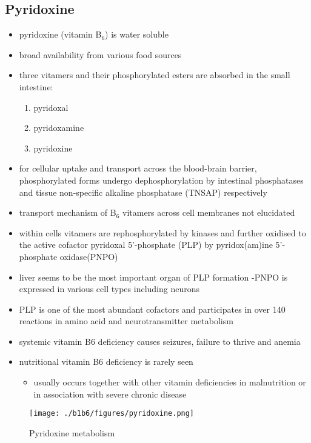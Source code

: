 \documentclass{scrartcl}
\begin{document}
\subsection{Pyridoxine}
\label{sec:org0349fe6}
\begin{itemize}
\item pyridoxine (vitamin B\(_{\text{6}}\)) is water soluble
\item broad availability from various food sources
\item three vitamers and their phosphorylated esters are absorbed in the
small intestine:
\begin{enumerate}
\item pyridoxal
\item pyridoxamine
\item pyridoxine
\end{enumerate}

\item for cellular uptake and transport across the blood-brain barrier,
phosphorylated forms undergo dephosphorylation by intestinal
phosphatases and tissue non-specific alkaline phosphatase (TNSAP)
respectively
\item transport mechanism of B\(_{\text{6}}\) vitamers across cell membranes not elucidated
\item within cells vitamers are rephosphorylated by kinases and further oxidised to the
active cofactor pyridoxal 5’-phosphate (PLP) by pyridox(am)ine
5’-phosphate oxidase(PNPO)
\item liver seems to be the most important organ of PLP formation
-PNPO is expressed in various cell types including neurons
\item PLP is one of the most abundant cofactors and participates in over
140 reactions in amino acid and neurotransmitter metabolism
\item systemic vitamin B6 deficiency causes seizures, failure to thrive
and anemia
\item nutritional vitamin B6 deficiency is rarely seen
\begin{itemize}
\item usually occurs together with other vitamin deficiencies in
malnutrition or in association with severe chronic disease
\end{itemize}
\end{itemize}


\begin{figure}[htbp]
\centering
\texttt{[image: ./b1b6/figures/pyridoxine.png]}
\caption{\label{fig:org0c628d0}
Pyridoxine metabolism}
\end{figure}
\end{document}
